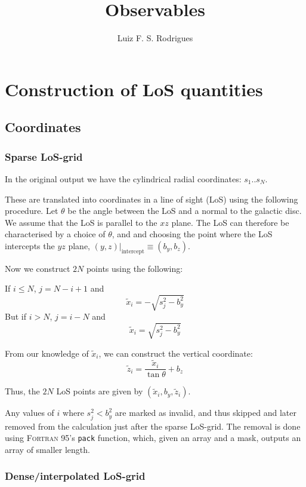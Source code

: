\documentclass[a4paper,10pt]{article}
\title{Observables}
\author{Luiz F. S. Rodrigues}
\begin{document}
\section{Construction of LoS quantities}
\subsection{Coordinates}

\subsubsection{Sparse LoS-grid}

In the original output we have the cylindrical radial coordinates: $s_1 .. s_N$.

These are translated into coordinates in a line of sight (LoS) using the following
procedure.
Let $\theta$ be the angle between the LoS and a normal to the galactic disc.
We assume that the LoS is parallel to the $xz$ plane. The LoS can therefore be
characterised by a choice of $\theta$, and and choosing the point where the LoS
intercepts the $yz$ plane, $(y, z)|_\text{intercept} \equiv(b_y,b_z)$.


Now we construct $2N$ points using the following:

If $i\leq N$, $j = N-i+1$ and
\begin{equation}
    \widetilde{x}_{i} = -\sqrt{s_j^2 - b_y^2}
\end{equation}
But if $i>N$, $j = i-N$ and
\begin{equation}
    \widetilde x_{i} = \sqrt{s_j^2 - b_y^2}
\end{equation}



From our knowledge of $\widetilde x_i$, we can construct the vertical coordinate:
\begin{equation}
    \widetilde z_i = \frac{\widetilde x_i}{\tan\theta} + b_z
\end{equation}

Thus, the $2N$ LoS points are given by $(\widetilde x_i,b_y, \widetilde z_i)$.

Any values of $i$ where ${s_j^2}<b_y^2$ are marked as invalid, and thus skipped
and later removed from the calculation just after the sparse LoS-grid.
The removal is done using \textsc{Fortran} 95's \texttt{pack}
function, which, given an array and a mask, outputs an array of smaller length.


\subsubsection{Dense/interpolated LoS-grid}
\end{document}
